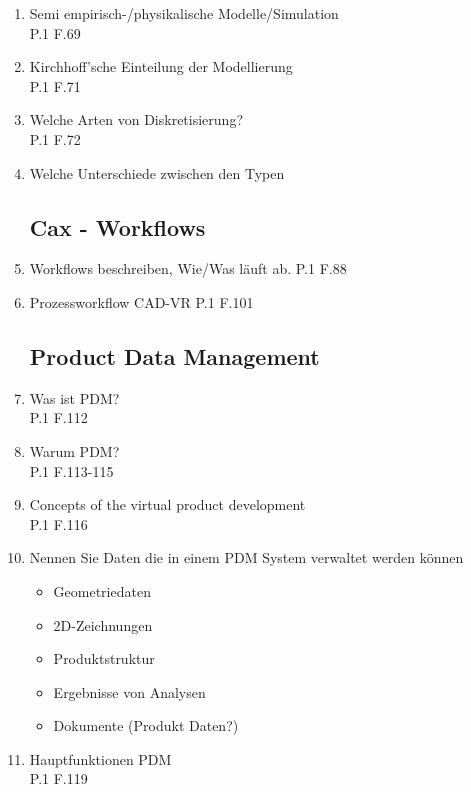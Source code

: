 \documentclass[10pt,a4paper,fleqn]{article}
\begin{document}
\begin{enumerate}
\section{Virtuelle Produktentwicklung}
\subsection{CAx - Methoden}
	\item Semi empirisch-/physikalische Modelle/Simulation\\
		P.1 F.69
	\item Kirchhoff'sche Einteilung der Modellierung\\
		P.1 F.71
	\item Welche Arten von Diskretisierung?\\
		P.1 F.72
	\item Welche Unterschiede zwischen den Typen
\subsection{Cax - Workflows}
	\item Workflows beschreiben, Wie/Was läuft ab.
		P.1 F.88
	\item Prozessworkflow CAD-VR
		P.1 F.101
\subsection{Product Data Management}
	\item Was ist PDM?\\
		P.1 F.112
	\item Warum PDM?\\
		P.1 F.113-115
	\item Concepts of the virtual product development\\
		P.1 F.116
	\item Nennen Sie Daten die in einem PDM System verwaltet werden können
		\begin{itemize}
			\item Geometriedaten
			\item 2D-Zeichnungen
			\item Produktstruktur
			\item Ergebnisse von Analysen
			\item Dokumente (Produkt Daten?)
		\end{itemize}
	\item Hauptfunktionen PDM\\
		P.1 F.119
\newpage

\end{enumerate}
\end{document}
